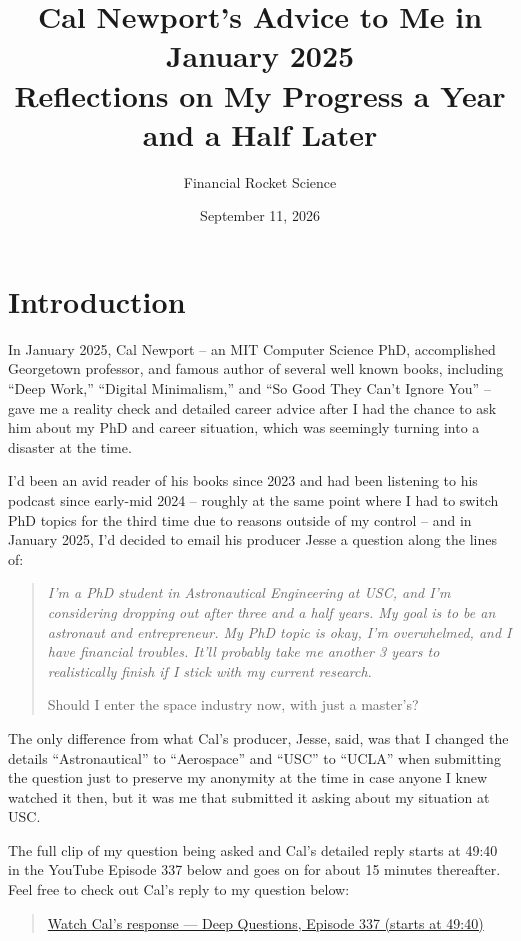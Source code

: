 \documentclass[11pt]{article}
\title{\textbf{Cal Newport's Advice to Me in January 2025 \\[6pt]
\large Reflections on My Progress a Year and a Half Later}}
\author{Financial Rocket Science}
\date{September 11, 2026}
\begin{document}
\maketitle

\section*{Introduction}

In January 2025, Cal Newport -- an MIT Computer Science PhD, accomplished Georgetown professor, and famous author of several well known books, including ``Deep Work,'' ``Digital Minimalism,'' and ``So Good They Can't Ignore You'' -- gave me a reality check and detailed career advice after I had the chance to ask him about my PhD and career situation, which was seemingly turning into a disaster at the time.

I'd been an avid reader of his books since 2023 and had been listening to his podcast since early-mid 2024 -- roughly at the same point where I had to switch PhD topics for the third time due to reasons outside of my control -- and in January 2025, I'd decided to email his producer Jesse a question along the lines of:

\begin{quote}
\itshape
I'm a PhD student in Astronautical Engineering at USC, and I'm considering dropping out after three and a half years. My goal is to be an astronaut and entrepreneur. My PhD topic is okay, I'm overwhelmed, and I have financial troubles. It'll probably take me another 3 years to realistically finish if I stick with my current research.

\medskip
Should I enter the space industry now, with just a master's?
\end{quote}

The only difference from what Cal's producer, Jesse, said, was that I changed the details ``Astronautical'' to ``Aerospace'' and ``USC'' to ``UCLA'' when submitting the question just to preserve my anonymity at the time in case anyone I knew watched it then, but it was me that submitted it asking about my situation at USC.

The full clip of my question being asked and Cal's detailed reply starts at 49:40 in the YouTube Episode 337 below and goes on for about 15 minutes thereafter. Feel free to check out Cal's reply to my question below:

\begin{quote}
\href{https://www.youtube.com/watch?v=gmoIIkm0gJc&t=2980s}{Watch Cal's response --- Deep Questions, Episode 337 (starts at 49:40)}
\end{quote}
\end{document}
